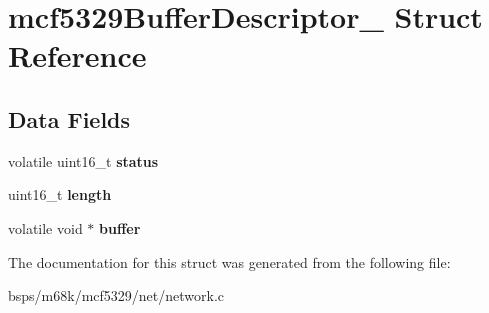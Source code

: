 \hypertarget{structmcf5329BufferDescriptor__}{}\section{mcf5329\+Buffer\+Descriptor\+\_\+ Struct Reference}
\label{structmcf5329BufferDescriptor__}
\subsection*{Data Fields}
\begin{DoxyCompactItemize}
\item 
\mbox{\label{structmcf5329BufferDescriptor___a7aef8ad5da1bd3af7093f65bba6b6921}} 
volatile uint16\+\_\+t {\bfseries status}
\item 
\mbox{\label{structmcf5329BufferDescriptor___ade68fa34db16de0c6b5b2c930eb881ae}} 
uint16\+\_\+t {\bfseries length}
\item 
\mbox{\label{structmcf5329BufferDescriptor___af25db8f09d507bd1997cf5772f0defa2}} 
volatile void $\ast$ {\bfseries buffer}
\end{DoxyCompactItemize}


The documentation for this struct was generated from the following file\+:\begin{DoxyCompactItemize}
\item 
bsps/m68k/mcf5329/net/network.\+c\end{DoxyCompactItemize}
